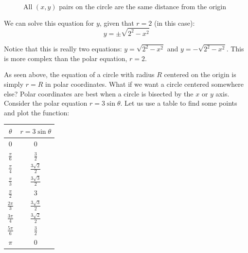 \begin{figure}[H]
\centering
    \caption{All $(x,y)$ pairs on the circle are the same distance from the origin}
    \label{fig:circle2}
    \end{figure}
    
We can solve this equation for $y$, given that $r = 2$ (in this case):
$$y = \pm \sqrt{2^2 - x^2}$$

Notice that this is really two equations: $y = \sqrt{2^2 - x^2}$ and $y = -\sqrt{
2^2 - x^2}$. This is more complex than the polar equation, $r = 2$. 

As seen above, the equation of a circle with radius $R$ centered on the origin 
is simply $r = R$ in polar coordinates. What if we want a circle centered 
somewhere else? Polar coordinates are best when a circle is bisected by the 
$x$ or $y$ axis. Consider the polar equation $r = 3 \sin{\theta}$. Let us use a 
table to find some points and plot the function:

\begin{center}
\begin{tabular}{|c|c|}\hline
$\theta$ & $r = 3 \sin{\theta}$\\\hline
$0$ & $0$\\\hline
$\frac{\pi}{6}$ & $\frac{3}{2}$\\\hline
$\frac{\pi}{4}$ & $\frac{3\sqrt{2}}{2}$\\\hline
$\frac{\pi}{3}$ & $\frac{3\sqrt{3}}{2}$\\\hline
$\frac{\pi}{2}$ & $3$\\\hline
$\frac{2\pi}{3}$ & $\frac{3\sqrt{3}}{2}$\\\hline
$\frac{3\pi}{4}$ & $\frac{3\sqrt{2}}{2}$\\\hline
$\frac{5\pi}{6}$ & $\frac{3}{2}$\\\hline
$\pi$ & $0$\\\hline
\end{tabular}
\end{center}


